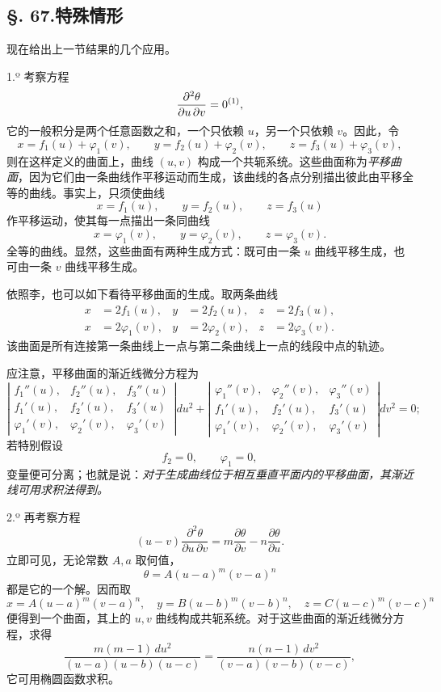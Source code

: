 \subsection*{§. 67.\quad 特殊情形}

现在给出上一节结果的几个应用。

1.º 考察方程
\[
\frac{\partial^2\theta}{\partial u\,\partial v}=0\srcfnmark{1},
\]
它的一般积分是两个任意函数之和，一个只依赖 \(u\)，另一个只依赖 \(v\)。因此，令
\begin{equation}\tag{26}
x=f_1(u)+\varphi_1(v), \qquad y=f_2(u)+\varphi_2(v), \qquad z=f_3(u)+\varphi_3(v),
\end{equation}
则在这样定义的曲面上，曲线 \((u,v)\) 构成一个共轭系统。这些曲面称为\emph{平移曲面}，因为它们由一条曲线作平移运动而生成，该曲线的各点分别描出彼此由平移全等的曲线。事实上，只须使曲线
\[
x=f_1(u), \qquad y=f_2(u), \qquad z=f_3(u)
\]
作平移运动，使其每一点描出一条同曲线
\[
x=\varphi_1(v), \qquad y=\varphi_2(v), \qquad z=\varphi_3(v).
\]
全等的曲线。显然，这些曲面有两种生成方式：既可由一条 \(u\) 曲线平移生成，也可由一条 \(v\) 曲线平移生成。

依照李，也可以如下看待平移曲面的生成。取两条曲线
\[
\begin{aligned}
x&=2f_1(u),& y&=2f_2(u),& z&=2f_3(u),\\
x&=2\varphi_1(v),& y&=2\varphi_2(v),& z&=2\varphi_3(v).
\end{aligned}
\]
该曲面是所有连接第一条曲线上一点与第二条曲线上一点的线段中点的轨迹。

应注意，平移曲面的渐近线微分方程为
\[
\left|
\begin{matrix}
f_1''(u),& f_2''(u),& f_3''(u)\\
f_1'(u),& f_2'(u),& f_3'(u)\\
\varphi_1'(v),& \varphi_2'(v),& \varphi_3'(v)
\end{matrix}
\right|du^2+
\left|
\begin{matrix}
\varphi_1''(v),& \varphi_2''(v),& \varphi_3''(v)\\
f_1'(u),& f_2'(u),& f_3'(u)\\
\varphi_1'(v),& \varphi_2'(v),& \varphi_3'(v)
\end{matrix}
\right|dv^2=0;
\]
若特别假设
\[
f_2=0, \qquad \varphi_1=0,
\]
变量便可分离；也就是说：\emph{对于生成曲线位于相互垂直平面内的平移曲面，其渐近线可用求积法得到。}

2.º 再考察方程
\begin{equation}\tag{27}
(u-v)\frac{\partial^2\theta}{\partial u\,\partial v}=m\frac{\partial\theta}{\partial v}-n\frac{\partial\theta}{\partial u}.
\end{equation}
立即可见，无论常数 \(A,a\) 取何值，
\[
\theta=A(u-a)^m(v-a)^n
\]
都是它的一个解。因而取
\[
x=A(u-a)^m(v-a)^n, \quad y=B(u-b)^m(v-b)^n, \quad z=C(u-c)^m(v-c)^n
\]
便得到一个曲面，其上的 \(u,v\) 曲线构成共轭系统。对于这些曲面的渐近线微分方程，求得
\[
\frac{m(m-1)\,du^2}{(u-a)(u-b)(u-c)}=\frac{n(n-1)\,dv^2}{(v-a)(v-b)(v-c)},
\]
它可用椭圆函数求积。

